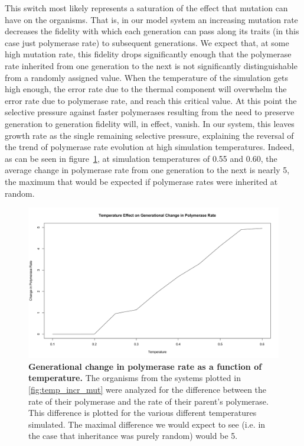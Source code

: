 This switch most likely represents a saturation of the effect that mutation can have on the organisms. That is, in our model system an increasing mutation rate decreases the fidelity with which each generation can pass along its traits (in this case just polymerase rate) to subsequent generations. We expect that, at some high mutation rate, this fidelity drops significantly enough that the polymerase rate inherited from one generation to the next is not significantly distinguishable from a randomly assigned value. When the temperature of the simulation gets high enough, the error rate due to the thermal component will overwhelm the error rate due to polymerase rate, and reach this critical value. At this point the selective pressure against faster polymerases resulting from the need to preserve generation to generation fidelity will, in effect, vanish. In our system, this leaves growth rate as the single remaining selective pressure, explaining the reversal of the trend of polymerase rate evolution at high simulation temperatures. Indeed, as can be seen in figure~\ref{fig:mut_rate}, at simulation temperatures of 0.55 and 0.60, the average change in polymerase rate from one generation to the next is nearly 5, the maximum that would be expected if polymerase rates were inherited at random.

\begin{figure}[!ht]
	\begin{center}
		\includegraphics[width=\textwidth]{mutation_rate}
	\end{center}
	\caption{
		{\bf Generational change in polymerase rate as a function of temperature.}  The organisms from the systems plotted in \ref{fig:temp_incr_mut} were analyzed for the difference between the rate of their polymerase and the rate of their parent's polymerase. This difference is plotted for the various different temperatures simulated. The maximal difference we would expect to see (i.e. in the case that inheritance was purely random) would be 5.
		}
		\label{fig:mut_rate}
\end{figure}

